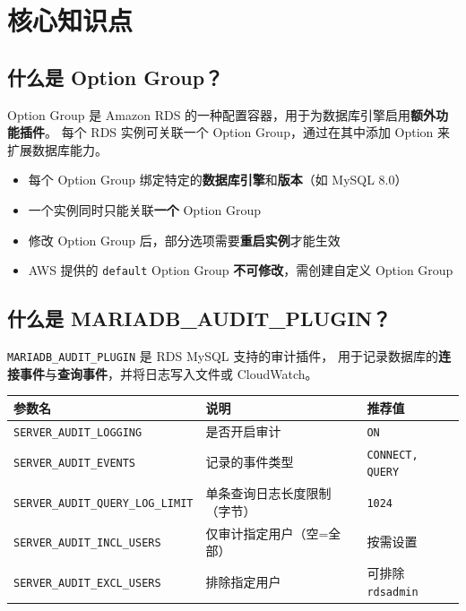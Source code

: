 \documentclass[12pt, a4paper]{article}
\begin{document}
\section{核心知识点}

\subsection{什么是 Option Group？}

Option Group 是 Amazon RDS 的一种配置容器，用于为数据库引擎启用\textbf{额外功能插件}。
每个 RDS 实例可关联一个 Option Group，通过在其中添加 Option 来扩展数据库能力。

\begin{tcolorbox}[colback=codebg, colframe=codeframe, title=Option Group 关键概念]
\begin{itemize}[leftmargin=1em]
  \item 每个 Option Group 绑定特定的\textbf{数据库引擎}和\textbf{版本}（如 MySQL 8.0）
  \item 一个实例同时只能关联\textbf{一个} Option Group
  \item 修改 Option Group 后，部分选项需要\textbf{重启实例}才能生效
  \item AWS 提供的 \texttt{default} Option Group \textbf{不可修改}，需创建自定义 Option Group
\end{itemize}
\end{tcolorbox}

\subsection{什么是 MARIADB\_AUDIT\_PLUGIN？}

\texttt{MARIADB\_AUDIT\_PLUGIN} 是 RDS MySQL 支持的审计插件，
用于记录数据库的\textbf{连接事件}与\textbf{查询事件}，并将日志写入文件或 CloudWatch。

\begin{center}
\begin{tabular}{lll}
\toprule
参数名 & 说明 & 推荐值 \\
\midrule
\texttt{SERVER\_AUDIT\_LOGGING} & 是否开启审计 & \texttt{ON} \\
\texttt{SERVER\_AUDIT\_EVENTS} & 记录的事件类型 & \texttt{CONNECT, QUERY} \\
\texttt{SERVER\_AUDIT\_QUERY\_LOG\_LIMIT} & 单条查询日志长度限制（字节）& \texttt{1024} \\
\texttt{SERVER\_AUDIT\_INCL\_USERS} & 仅审计指定用户（空=全部）& 按需设置 \\
\texttt{SERVER\_AUDIT\_EXCL\_USERS} & 排除指定用户 & 可排除 \texttt{rdsadmin} \\
\bottomrule
\end{tabular}
\end{center}
\end{document}
